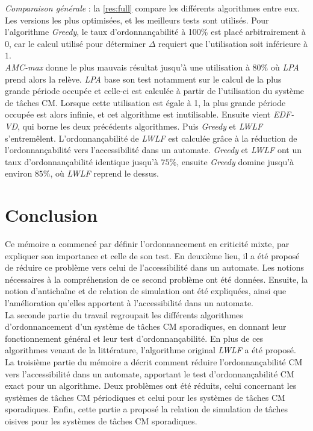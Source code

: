 \documentclass[12pt,a4paper,oneside]{book}
\theoremstyle{break}
\theoremstyle{breakplain}
\begin{document}
\textit{Comparaison générale} : la \autoref{res:full} compare les différents algorithmes entre eux. Les versions les plus optimisées, et les meilleurs tests sont utilisés. Pour l'algorithme \textit{Greedy}, le taux d'ordonnançabilité à 100\% est placé arbitrairement à 0, car le calcul utilisé pour déterminer $\Delta$ requiert que l'utilisation soit inférieure à $1$.\\

\textit{AMC-max} donne le plus mauvais résultat jusqu'à une utilisation à 80\% où \textit{LPA} prend alors la relève. \textit{LPA} base son test notamment sur le calcul de la plus grande période occupée et celle-ci est calculée à partir de l'utilisation du système de tâches CM. Lorsque cette utilisation est égale à 1, la plus grande période occupée est alors infinie, et cet algorithme est inutilisable. Ensuite vient \textit{EDF-VD}, qui borne les deux précédents algorithmes. Puis \textit{Greedy} et \textit{LWLF} s'entremêlent. L'ordonnançabilité de \textit{LWLF} est calculée grâce à la réduction de l'ordonnançabilité vers l'accessibilité dans un automate. \textit{Greedy} et \textit{LWLF} ont un taux d'ordonnançabilité identique jusqu'à $75\%$, ensuite \textit{Greedy} domine jusqu'à environ $85\%$, où \textit{LWLF} reprend le dessus.

\chapter{Conclusion}
\label{chap:ccl}
Ce mémoire a commencé par définir l'ordonnancement en criticité mixte, par expliquer son importance et celle de son test. En deuxième lieu, il a été proposé de réduire ce problème vers celui de l'accessibilité dans un automate. Les notions nécessaires à la compréhension de ce second problème ont été données. Ensuite, la notion d'antichaîne et de relation de simulation ont été expliquées, ainsi que l'amélioration qu'elles apportent à l'accessibilité dans un automate.\\

La seconde partie du travail regroupait les différents algorithmes d'ordonnancement d'un système de tâches CM sporadiques, en donnant leur fonctionnement général et leur test d'ordonnançabilité. En plus de ces algorithmes venant de la littérature, l'algorithme original \textit{LWLF} a été proposé.\\

La troisième partie du mémoire a décrit comment réduire l'ordonnançabilité CM vers l'accessibilité dans un automate, apportant le test d'ordonnançabilité CM exact pour un algorithme. Deux problèmes ont été réduits, celui concernant les systèmes de tâches CM périodiques et celui pour les systèmes de tâches CM sporadiques. Enfin, cette partie a proposé la relation de simulation de tâches oisives pour les systèmes de tâches CM sporadiques.\\
\end{document}
